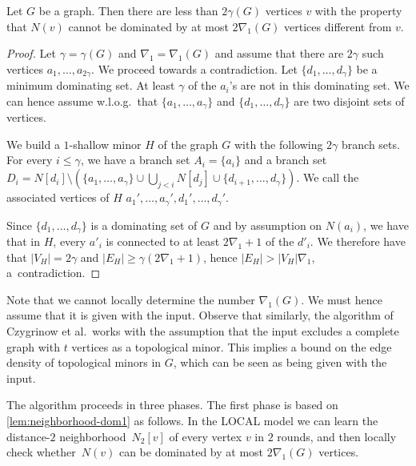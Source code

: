 \begin{lemma}\label{lem:neighborhood-dom1}
Let $G$ be a graph. Then there are less than $2\gamma(G)$ vertices $v$ with the property that $N(v)$ cannot be dominated by at most $2\nabla_1(G)$ vertices different from $v$.
\end{lemma}
\begin{proof}
Let $\gamma=\gamma(G)$ and $\nabla_1=\nabla_1(G)$ and assume that there are $2\gamma$ such vertices $a_1,\ldots,a_{2\gamma}$. We proceed towards a contradiction.
  Let $\{d_1,\ldots,d_\gamma\}$ be a minimum dominating set. At least $\gamma$ of the $a_i$'s are not in this dominating set. We can hence assume w.l.o.g.~that $\{a_1,\ldots,a_{\gamma}\}$ and $\{d_1,\ldots,d_\gamma\}$ are two disjoint sets of vertices.

We build a $1$-shallow minor $H$ of the graph $G$ with the following $2\gamma$ branch sets. For every $i\le \gamma$, we have a branch set
$A_i=\{a_i\}$ and a branch set $D_i=N[d_i]\setminus (\{a_1,\ldots, a_\gamma\}\cup \bigcup_{j<i}N[d_j] \cup \{d_{i+1},\ldots, d_\gamma\})$.
We call the associated vertices of $H$ $a_1',\ldots, a_\gamma',d_1',\ldots,
d_\gamma'$.

Since $\{d_1,\ldots, d_\gamma\}$ is a dominating set of $G$ and by assumption on $N(a_i)$, we have that in $H$, every $a'_i$ is connected to at least $2\nabla_1+1$ of the $d'_i$.
  We therefore have that $|V_H|=2\gamma$ and $|E_H| \ge \gamma(2\nabla_1+1)$, hence $|E_H|> |V_H|\nabla_1$, a~contradiction.
\end{proof}

\hrulefill


Note that we cannot locally determine the number $\nabla_1(G)$.
We must hence assume that it is given with the input. Observe that
similarly, the algorithm of Czygrinow et al.\ works with the assumption
that the input excludes a complete graph with $t$ vertices as a topological
minor. This implies a bound on the edge density of topological minors
in $G$, which can be seen as being given with the input.

The algorithm proceeds in three phases. The first phase is
based on \cref{lem:neighborhood-dom1} as follows.
In the LOCAL model we can learn the distance-$2$
neighborhood~$N_2[v]$ of every vertex $v$ in $2$ rounds,
and then locally check
whether~$N(v)$ can be domi\-nated by at most $2\nabla_1(G)$
vertices.

